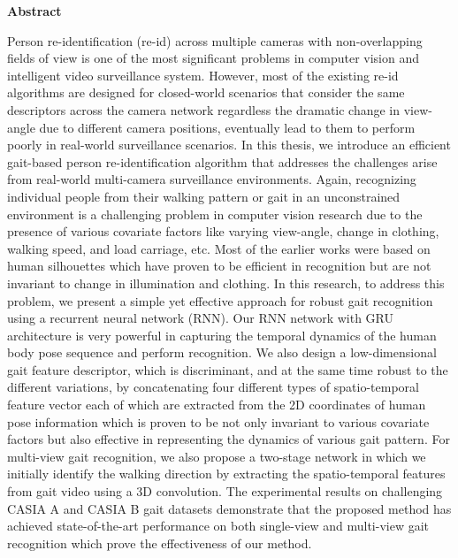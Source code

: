 \begin{center}
	\textbf{{\Large Abstract}}\\[60pt]
\end{center}


Person re-identification (re-id) across multiple cameras with non-overlapping fields of view is one of the most significant problems in computer vision and intelligent video surveillance system. However, most of the existing re-id algorithms are designed for closed-world scenarios that consider the same descriptors across the camera network regardless the dramatic change in view-angle due to different camera positions, eventually lead to them to perform poorly in real-world surveillance scenarios. In this thesis, we introduce an efficient gait-based person re-identification algorithm that addresses the challenges arise from real-world multi-camera surveillance environments. Again, recognizing individual people from their walking pattern or gait in an unconstrained environment is a challenging problem in computer vision research due to the presence of various covariate factors like varying view-angle, change in clothing, walking speed, and load carriage, etc. Most of the earlier works were based on human silhouettes which have proven to be efficient in recognition but are not invariant to change in illumination and clothing. In this research, to address this problem, we present a simple yet effective approach for robust gait recognition using a recurrent neural network (RNN). Our RNN network with GRU architecture is very powerful in capturing the temporal dynamics of the human body pose sequence and perform recognition. We also design a low-dimensional gait feature descriptor, which is discriminant, and at the same time robust to the different variations, by concatenating four different types of spatio-temporal feature vector each of which are extracted from the 2D coordinates of human pose information which is proven to be not only invariant to various covariate factors but also effective in representing the dynamics of various gait pattern. For multi-view gait recognition, we also propose a two-stage network in which we initially identify the walking direction by extracting the spatio-temporal features from gait video using a 3D convolution. The experimental results on challenging CASIA A and CASIA B gait datasets demonstrate that the proposed method has achieved state-of-the-art performance on both single-view and multi-view gait recognition which prove the effectiveness of our method. 

\endinput
